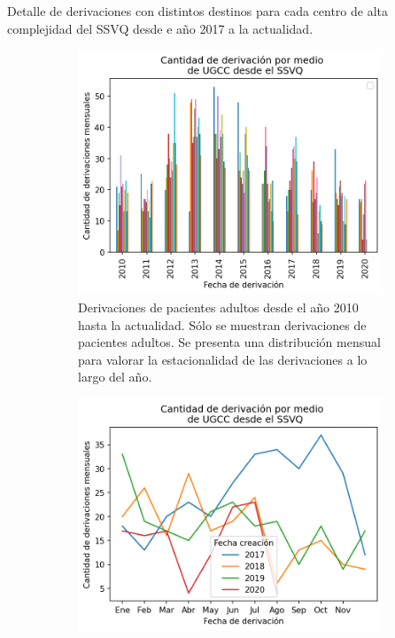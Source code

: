 \documentclass{article}
\begin{document}
\begin{table}[p]
	\begin{adjustbox}{width=0.95\textwidth}
	\end{adjustbox}
	\caption{Detalle de derivaciones con distintos destinos para cada centro de alta complejidad del SSVQ desde e año 2017 a la actualidad.} 
	\label{tab: derivaciones por hospital y destino}
\end{table}


\begin{figure}[p]
	\begin{subfigure}{.5\textwidth}
		\centering
		\includegraphics[width=.8\linewidth]{./figuras/Derivaciones10_20.png}
		\caption{Derivaciones de pacientes adultos desde el año 2010 hasta la actualidad. Sólo se muestran derivaciones de pacientes adultos. Se presenta una distribución mensual para valorar la estacionalidad de las derivaciones a lo largo del año.}
	\end{subfigure}%
	\begin{subfigure}{.5\textwidth}
		\centering
		\includegraphics[width=.8\linewidth]{./figuras/Derivaciones17_20.png}

\end{subfigure}
\end{figure}
\end{document}
